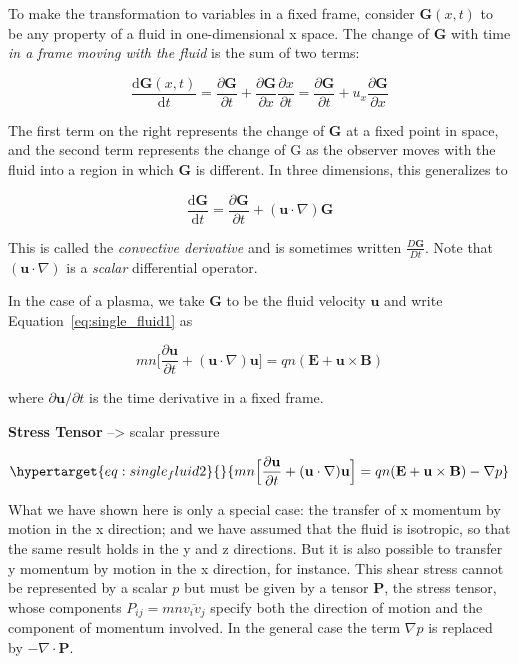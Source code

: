 \documentclass[
  notoc %
]{tufte-book}
\begin{document}
To make the transformation to variables in a fixed frame, consider
\(\mathbf{G}(x,t)\) to be any property of a fluid in one-dimensional x
space. The change of \(\mathbf{G}\) with time \emph{in a frame moving
with the fluid} is the sum of two terms:

\[
\frac{\mathrm{d}\mathbf{G}(x,t)}{\mathrm{d}t} = \frac{\partial \mathbf{G}}{\partial t} + \frac{\partial \mathbf{G}}{\partial x}\frac{\partial x}{\partial t} = \frac{\partial \mathbf{G}}{\partial t} + u_x\frac{\partial \mathbf{G}}{\partial x}
\]

The first term on the right represents the change of \(\mathbf{G}\) at a
fixed point in space, and the second term represents the change of G as
the observer moves with the fluid into a region in which \(\mathbf{G}\)
is different. In three dimensions, this generalizes to

\[
\frac{\mathrm{d}\mathbf{G}}{\mathrm{d}t} = \frac{\partial \mathbf{G}}{\partial t} + (\mathbf{u}\cdot\nabla)\mathbf{G}
\]

This is called the \emph{convective derivative} and is sometimes written
\(\frac{D\mathbf{G}}{Dt}\). Note that \((\mathbf{u}\cdot\nabla)\) is a
\emph{scalar} differential operator.

In the case of a plasma, we take \(\mathbf{G}\) to be the fluid velocity
\(\mathbf{u}\) and write Equation~\ref{eq:single_fluid1} as

\[
mn\Big[\frac{\partial\mathbf{u}}{\partial t} + (\mathbf{u}\cdot\nabla)\mathbf{u}\Big] = qn(\mathbf{E}+\mathbf{u}\times\mathbf{B})
\]

where \(\partial\mathbf{u}/\partial t\) is the time derivative in a
fixed frame.

\textbf{Stress Tensor} --\textgreater{} scalar pressure

\begin{equation}\protect\hypertarget{eq:single_fluid2}{}{
mn\Big[\frac{\partial\mathbf{u}}{\partial t} + (\mathbf{u}\cdot\nabla)\mathbf{u}\Big] = qn(\mathbf{E}+\mathbf{u}\times\mathbf{B}) - \nabla p
}\label{eq:single_fluid2}\end{equation}

What we have shown here is only a special case: the transfer of x
momentum by motion in the x direction; and we have assumed that the
fluid is isotropic, so that the same result holds in the y and z
directions. But it is also possible to transfer y momentum by motion in
the x direction, for instance. This shear stress cannot be represented
by a scalar \(p\) but must be given by a tensor \(\mathbf{P}\), the
stress tensor, whose components \(P_{ij}= mn\overline{v_i v_j}\) specify
both the direction of motion and the component of momentum involved. In
the general case the term \(\nabla p\) is replaced by
\(-\nabla\cdot\mathbf{P}\).
\end{document}

